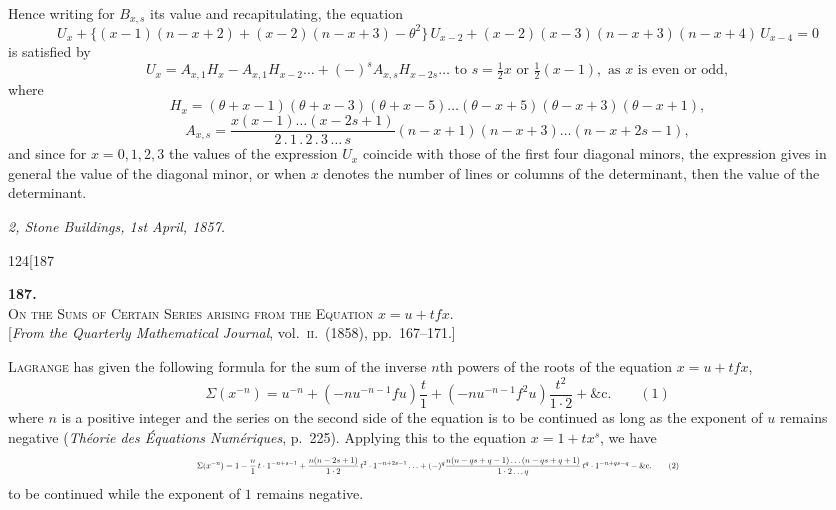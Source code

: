 \documentclass[11pt]{article}
\begin{document}
\medskip
Hence writing for $B_{x,s}$ its value and recapitulating, the equation
\[
U_{x} + \{(x-1)(n-x+2) + (x-2)(n-x+3) - \theta^{2}\}\, U_{x-2} + (x-2)(x-3)(n-x+3)(n-x+4)\, U_{x-4} = 0
\]
is satisfied by
\[
U_{x} = A_{x,1} H_{x} - A_{x,1} H_{x-2}\ldots + (-)^{s} A_{x,s} H_{x-2s}\ldots \text{ to } s = \tfrac{1}{2}x \text{ or } \tfrac{1}{2}(x-1), \text{ as } x \text{ is even or odd},
\]
where
\[
H_{x} = (\theta+x-1)(\theta+x-3)(\theta+x-5)\ldots(\theta-x+5)(\theta-x+3)(\theta-x+1),
\]
\[
A_{x,s} = \frac{x(x-1)\ldots(x-2s+1)}{2\,.\,1\,.\,2\,.\,3\,\ldots\,s}(n-x+1)(n-x+3)\ldots(n-x+2s-1),
\]
and since for $x=0,1,2,3$ the values of the expression $U_{x}$ coincide with those of the
first four diagonal minors, the expression gives in general the value of the diagonal
minor, or when $x$ denotes the number of lines or columns of the determinant, then
the value of the determinant.

\medskip
\textit{2, Stone Buildings, 1st April, 1857.}

\bigskip
\begin{center}\small\textsc{124}\hfill[187\end{center}

\begin{center}
\textbf{187.}\\[0.5em]
\textsc{On the Sums of Certain Series arising from the Equation $x = u + tf x$.}\\[0.4em]
\small [\textit{From the Quarterly Mathematical Journal}, vol.\ \textsc{ii}.\ (1858), pp.\ 167--171.]
\end{center}

\medskip
\noindent \textsc{Lagrange} has given the following formula for the sum of the inverse $n$th powers
of the roots of the equation $x = u + t f x$,
\[
\Sigma(x^{-n}) = u^{-n} + (-nu^{-n-1}f u)\frac{t}{1} + (-nu^{-n-1}f^{2} u)\frac{t^{2}}{1\cdot 2} + \&\text{c.} \qquad (1)
\]
where $n$ is a positive integer and the series on the second side of the equation is
to be continued as long as the exponent of $u$ remains negative (\textit{Th\'eorie des \'Equations
Num\'eriques}, p.\ 225). Applying this to the equation $x = 1 + tx^{s}$, we have
\[ \resizebox{\textwidth}{!}{$\displaystyle
\Sigma(x^{-n}) = 1 - \frac{n}{1}\,t\cdot 1^{-n+s-1} + \frac{n(n-2s+1)}{1\cdot 2}\,t^{2}\cdot 1^{-n+2s-1}\ldots + (-)^{q}\frac{n(n-qs+q-1)\ldots(n-qs+q+1)}{1\cdot 2\ldots q}\,t^{q}\cdot 1^{-n+qs-q} - \&\text{c.} \qquad (2)
$} \]
to be continued while the exponent of $1$ remains negative.
\end{document}
